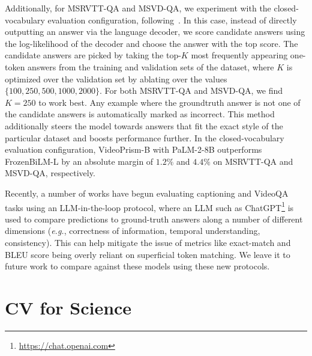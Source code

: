 \documentclass{article}
\theoremstyle{plain}
\theoremstyle{definition}
\theoremstyle{remark}
\newcommand{\OURS}{VideoPrism\xspace}
\newcommand{\eg}{\textit{e.g.}\xspace}
\begin{document}
Additionally, for MSRVTT-QA and MSVD-QA, we experiment with the closed-vocabulary evaluation configuration, following~\citet{li2022blip,yang2022zero}. In this case, instead of directly outputting an answer via the language decoder, we score candidate answers using the log-likelihood of the decoder and choose the answer with the top score. The candidate answers are picked by taking the top-$K$ most frequently appearing one-token answers from the training and validation sets of the dataset, where $K$ is optimized over the validation set by ablating over the values $\{100, 250, 500, 1000, 2000\}$.  For both MSRVTT-QA and MSVD-QA, we find $K = 250$ to work best. Any example where the groundtruth answer is not one of the candidate answers is automatically marked as incorrect. This method additionally steers the model towards answers that fit the exact style of the particular dataset and boosts performance further. In the closed-vocabulary evaluation configuration, \OURS-B with PaLM-2-8B outperforms FrozenBiLM-L by an absolute margin of $1.2\%$ and $4.4\%$ on MSRVTT-QA and MSVD-QA, respectively.

Recently, a number of works \cite{maaz2023video,lin2023video,li2023llama} have begun evaluating captioning and VideoQA tasks using an LLM-in-the-loop protocol, where an LLM such as ChatGPT\footnote{\url{https://chat.openai.com}} is used to compare predictions to ground-truth answers along a number of different dimensions (\eg, correctness of information, temporal understanding, consistency). This can help mitigate the issue of metrics like exact-match and BLEU score being overly reliant on superficial token matching. We leave it to future work to compare against these models using these new protocols. 



%
 \section{CV for Science}\label{app:cv4science}
\end{document}
